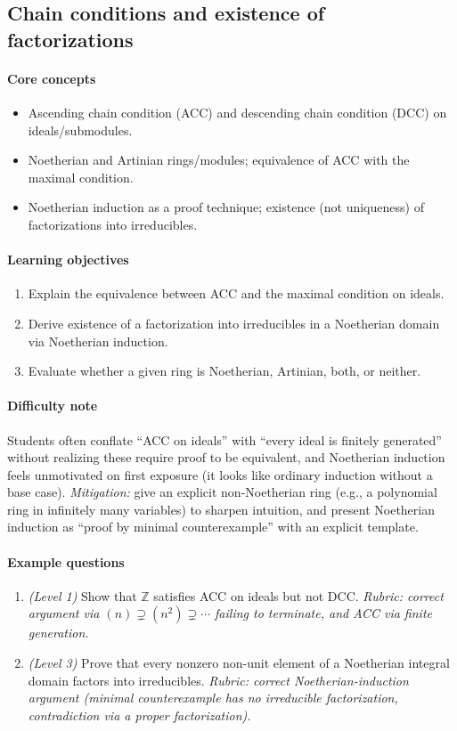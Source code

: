 \documentclass{article}
\begin{document}
\subsection{Chain conditions and existence of factorizations}
\paragraph{Core concepts}
\begin{itemize}[nosep]
  \item Ascending chain condition (ACC) and descending chain condition (DCC) on ideals/submodules.
  \item Noetherian and Artinian rings/modules; equivalence of ACC with the maximal condition.
  \item Noetherian induction as a proof technique; existence (not uniqueness) of factorizations into irreducibles.
\end{itemize}
\paragraph{Learning objectives}
\begin{enumerate}[nosep]
  \item Explain the equivalence between ACC and the maximal condition on ideals.
  \item Derive existence of a factorization into irreducibles in a Noetherian domain via Noetherian induction.
  \item Evaluate whether a given ring is Noetherian, Artinian, both, or neither.
\end{enumerate}
\paragraph{Difficulty note}
Students often conflate ``ACC on ideals'' with ``every ideal is finitely generated'' without realizing these require proof to be equivalent, and Noetherian induction feels unmotivated on first exposure (it looks like ordinary induction without a base case). \emph{Mitigation:} give an explicit non-Noetherian ring (e.g., a polynomial ring in infinitely many variables) to sharpen intuition, and present Noetherian induction as ``proof by minimal counterexample'' with an explicit template.
\paragraph{Example questions}
\begin{enumerate}[nosep]
  \item \emph{(Level 1)} Show that $\mathbb{Z}$ satisfies ACC on ideals but not DCC. \emph{Rubric: correct argument via $(n) \supsetneq (n^2) \supsetneq \cdots$ failing to terminate, and ACC via finite generation.}
  \item \emph{(Level 3)} Prove that every nonzero non-unit element of a Noetherian integral domain factors into irreducibles. \emph{Rubric: correct Noetherian-induction argument (minimal counterexample has no irreducible factorization, contradiction via a proper factorization).}
\end{enumerate}
\end{document}
